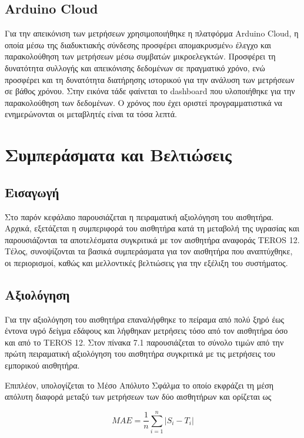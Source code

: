 \section{ Arduino Cloud}
Για την απεικόνιση των μετρήσεων χρησιμοποιήθηκε η πλατφόρμα Arduino Cloud, η οποία μέσω της διαδυκτιακής σύνδεσης προσφέρει απομακρυσμένo έλεγχο και παρακολούθηση των μετρήσεων μέσω συμβατών μικροελεγκτών. Προσφέρει τη δυνατότητα συλλογής και απεικόνισης δεδομένων σε πραγματικό χρόνο, ενώ προσφέρει και τη δυνατότητα διατήρησης ιστορικού για την ανάλυση των  μετρήσεων σε βάθος χρόνου. Στην εικόνα τάδε φαίνεται το dashboard που υλοποιήθηκε για την παρακολούθηση των δεδομένων. Ο χρόνος που έχει οριστεί προγραμματιστικά να ενημερώνονται οι μεταβλητές είναι τα τόσα λεπτά.






\chapter{Συμπεράσματα και Βελτιώσεις}
\label{ch:end}

\section{Εισαγωγή}
Στο παρόν κεφάλαιο παρουσιάζεται η πειραματική αξιολόγηση του αισθητήρα. Αρχικά, εξετάζεται η συμπεριφορά του αισθητήρα κατά τη μεταβολή της υγρασίας και παρουσιάζονται τα αποτελέσματα συγκριτικά με τον αισθητήρα αναφοράς TEROS 12. Τέλος, συνοψίζονται τα βασικά συμπεράσματα για τον αισθητήρα που αναπτύχθηκε, οι περιορισμοί, καθώς και μελλοντικές βελτιώσεις για την εξέλιξη του συστήματος.

\section{Αξιολόγηση}
Για την αξιολόγηση του αισθητήρα επαναλήφθηκε το πείραμα από πολύ ξηρό έως έντονα υγρό δείγμα εδάφους και λήφθηκαν μετρήσεις τόσο από τον αισθητήρα όσο και από το TEROS 12. Στον πίνακα 7.1 παρουσιάζεται το σύνολο τιμών από την πρώτη πειραματική αξιολόγηση του αισθητήρα συγκριτικά με τις μετρήσεις του εμπορικού αισθητήρα.

\par Επιπλέον, υπολογίζεται το Μέσο Απόλυτο Σφάλμα το οποίο εκφράζει τη μέση απόλυτη διαφορά μεταξύ των μετρήσεων των δύο αισθητήρων και ορίζεται ως

\[
MAE = \frac{1}{n}\sum_{i=1}^{n}\left|S_i - T_i\right|
\tag{7.1}\]


